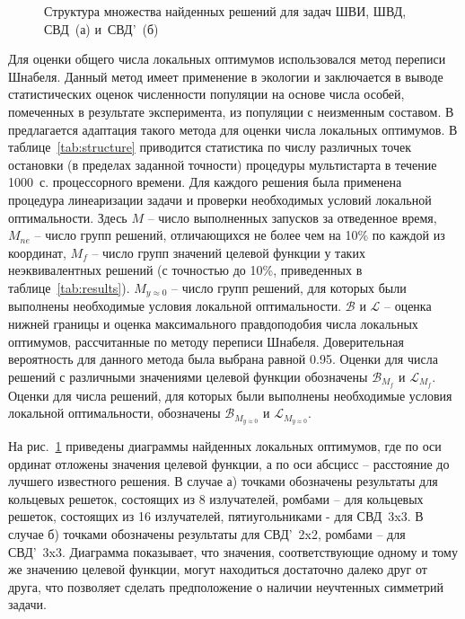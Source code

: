 \begin{figure}
\centering
    \begin{minipage}[h]{0.8\linewidth}
    \end{minipage}
    \begin{minipage}[h]{\linewidth}
    \end{minipage}
    \vspace{0.7em}
    \caption{Структура множества найденных решений для задач ШВИ, ШВД, СВД~(а) и~СВД'~(б)}
    \label{ris:fit_dist}
\end{figure}

Для оценки общего числа локальных оптимумов использовался метод переписи Шнабеля. Данный метод имеет применение в экологии и заключается в
выводе статистических оценок численности популяции на основе числа особей, помеченных в результате эксперимента, из популяции с неизменным
составом. В~ предлагается адаптация такого метода для оценки числа локальных оптимумов. В таблице~\ref{tab:structure} приводится статистика по числу различных точек остановки (в пределах заданной точности) процедуры мультистарта в течение 1000~с. процессорного времени. Для каждого решения была применена процедура линеаризации задачи и проверки необходимых условий локальной оптимальности. Здесь {$M$} -- число выполненных запусков за отведенное время, $M_{ne}$ -- число групп решений, отличающихся не более чем на 10\% по каждой из координат, {$M_{f}$} -- число групп значений целевой функции у таких неэквивалентных решений (с точностью до 10\%, приведенных в таблице~\ref{tab:results}). {$M_{y\approx0}$} -- число групп решений, для которых были выполнены необходимые условия локальной оптимальности. $\mathcal{B}$ и $\mathcal{L}$ -- оценка нижней границы и оценка максимального правдоподобия числа локальных оптимумов, рассчитанные по методу переписи Шнабеля. Доверительная вероятность для данного метода была выбрана равной 0.95. Оценки для числа решений с различными значениями целевой функции обозначены $\mathcal{B}_{M_f}$ и $\mathcal{L}_{M_f}$. Оценки для числа решений, для которых были выполнены необходимые условия локальной оптимальности, обозначены $\mathcal{B}_{M_{y\approx0}}$ и $\mathcal{L}_{M_{y\approx0}}$.

На рис.~\ref{ris:fit_dist} приведены диаграммы найденных локальных оптимумов, где по оси ординат отложены значения целевой функции, а по оси абсцисс -- расстояние до лучшего известного решения. В случае а) точками обозначены результаты для кольцевых решеток, состоящих из 8 излучателей, ромбами -- для кольцевых решеток, состоящих из 16 излучателей, пятиугольниками - для СВД~3x3. В случае б) точками обозначены результаты для СВД'~2x2, ромбами -- для СВД'~3x3. Диаграмма показывает, что значения, соответствующие одному и тому же значению целевой функции, могут находиться достаточно далеко друг от друга, что позволяет сделать предположение о наличии неучтенных симметрий задачи.


